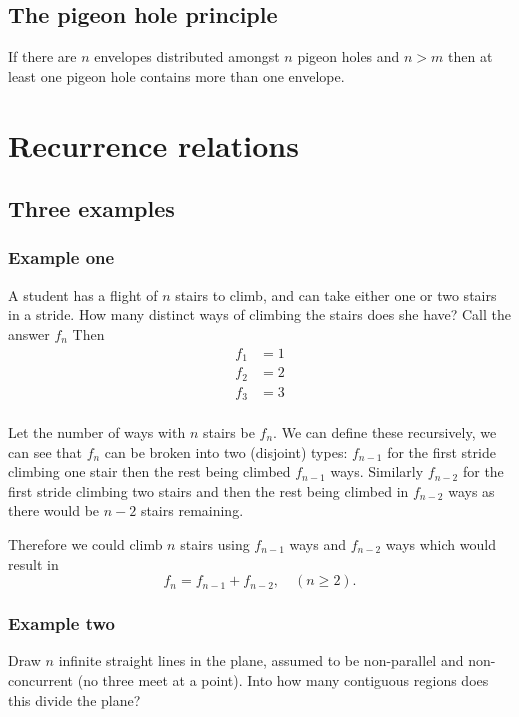 \documentclass[10pt, a4paper]{article}
\begin{document}
\subsection{The pigeon hole principle}
If there are $n$ envelopes distributed amongst $n$ pigeon holes and $n > m$ then at least one pigeon hole contains more than one envelope.

\newpage

\section{Recurrence relations}
\subsection{Three examples}
\subsubsection{Example one}
A student has a flight of $n$ stairs to climb,
and can take either one or two stairs in a stride.
How many distinct ways of climbing the stairs does she have?
Call the answer $f_n$
Then
\begin{align*}
    f_1 &= 1 \\
    f_2 &= 2 \\
    f_3 &= 3 \\
\end{align*}

Let the number of ways with $n$ stairs be $f_n$.
We can define these recursively,
we can see that $f_n$ can be broken into two (disjoint) types:
$f_{n - 1}$ for the first stride climbing one stair then the rest being climbed $f_{n - 1}$ ways.
Similarly $f_{n - 2}$ for the first stride climbing two stairs and then the rest being climbed in $f_{n - 2}$ ways as there would be $n - 2$ stairs remaining.

Therefore we could climb $n$ stairs using $f_{n - 1}$ ways and $f_{n - 2}$ ways which would result in
\[
f_{n} = f_{n - 1} + f_{n - 2},\quad(n \geq 2).
\]

\subsubsection{Example two}
Draw $n$ infinite straight lines in the plane,
assumed to be non-parallel and non-concurrent
(no three meet at a point).
Into how many contiguous regions does this divide the plane?
\end{document}
